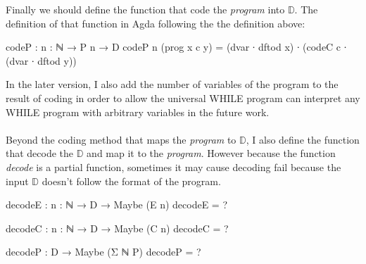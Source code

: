 \documentclass{jfrarticle}
\newcommand{\md}[1]{$\mathds{#1}$}
\begin{document}
Finally we should define the function that code the \textit{program} into \md{D}.
The definition of that function in Agda following the the definition above:
\begin{code}[fontsize=\small]
codeP : {n : ℕ} → P n → D
codeP {n} (prog x c y) = (dvar ∙ dftod x) ∙
                         (codeC c ∙
                         (dvar ∙ dftod y))
\end{code}
In the later version, I also add the number of variables of the program to the result of coding in order to allow the universal WHILE program can interpret any WHILE program with arbitrary variables in the future work.\\\\
Beyond the coding method that maps the \textit{program} to \md{D}, I also define the function that decode the \md{D} and map it to the \textit{program}.
However because the function \textit{decode} is a partial function, sometimes it may cause decoding fail because the input \md{D} doesn't follow the format of the program.
\begin{code}[fontsize=\small]
decodeE : {n : ℕ} → D → Maybe (E n)
decodeE = ?

decodeC : {n : ℕ} → D → Maybe (C n)
decodeC = ?

decodeP : D → Maybe (Σ ℕ P)
decodeP = ?
\end{code}
\end{document}
